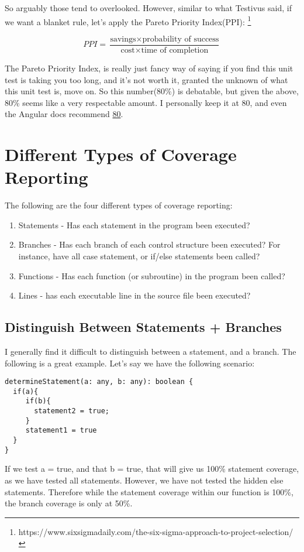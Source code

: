 So arguably those tend to overlooked. However, similar to what Testivus said, if we want a blanket rule, let's apply the Pareto Priority Index(PPI): \footnote{https://www.sixsigmadaily.com/the-six-sigma-approach-to-project-selection/}

\[
PPI = \frac{\text{savings} \times \text{probability of success}}
           {\text{cost} \times \text{time of completion}}
\]

The Pareto Priority Index, is really just fancy way of saying if you find this unit test is taking you too long, and it's not worth it, granted the unknown of what this unit test is, move on. So this number(80\%) is debatable, but given the above, 80\% seems like a very respectable amount. I personally keep it at 80, and even the Angular docs recommend \href{https://github.com/angular/angular-cli/wiki/stories-code-coverage}{80}.

\section{ Different Types of Coverage Reporting }
The following are the four different types of coverage reporting:
\begin{enumerate}
  \item Statements - Has each statement in the program been executed?
  \item Branches - Has each branch of each control structure been executed? For instance, have all case statement, or if/else statements been called?
  \item Functions - Has each function (or subroutine) in the program been called?
  \item Lines - has each executable line in the source file been executed?
\end{enumerate}

\subsection{Distinguish Between Statements + Branches}
I generally find it difficult to distinguish between a statement, and a branch. The following is a great example. Let's say we have the following scenario:
\begin{lstlisting}
determineStatement(a: any, b: any): boolean {
  if(a){
     if(b){
       statement2 = true;
     }
     statement1 = true
  }
}
\end{lstlisting}

If we test a = true, and that b = true, that will give us 100\% statement coverage, as we have tested all statements. However, we have not tested the hidden else statements. Therefore while the statement coverage within our function is 100\%, the branch coverage is only at 50\%.

